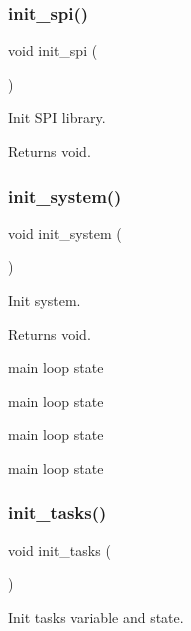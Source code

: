 \subsubsection{\texorpdfstring{init\+\_\+spi()}{init\_spi()}}
{\footnotesize\ttfamily void init\+\_\+spi (\begin{DoxyParamCaption}{ }\end{DoxyParamCaption})}



Init S\+PI library. 

\begin{DoxyReturn}{Returns}
void. 
\end{DoxyReturn}
\mbox{\label{i2c-th_8h_a348d23d5899ce59d18975284dfb0afc0}} 
\subsubsection{\texorpdfstring{init\+\_\+system()}{init\_system()}}
{\footnotesize\ttfamily void init\+\_\+system (\begin{DoxyParamCaption}{ }\end{DoxyParamCaption})}



Init system. 

\begin{DoxyReturn}{Returns}
void. 
\end{DoxyReturn}
main loop state

main loop state

main loop state

main loop state \mbox{\label{i2c-th_8h_a2aae2290a141fddcea3fb6009acbb445}} 
\subsubsection{\texorpdfstring{init\+\_\+tasks()}{init\_tasks()}}
{\footnotesize\ttfamily void init\+\_\+tasks (\begin{DoxyParamCaption}{ }\end{DoxyParamCaption})}



Init tasks variable and state. 


